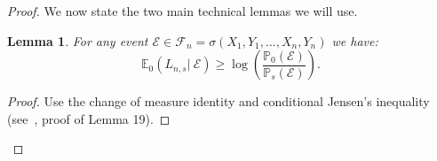 \documentclass[final,12pt]{colt2018}
\newtheorem{lem}{Lemma}
\begin{document}
\begin{proof}


We now state the two main technical lemmas we will use.

\begin{lem}\label{lem:1}
For any event $\mathcal E \in \mathcal F_n = \sigma(X_1, Y_1, ..., X_{n}, Y_{n})$ we have:
$$
\mathbb E_0(L_{n,s} | \ \mathcal E) \geq \log \left( \frac{\mathbb P_0(\mathcal E)}{\mathbb P_s(\mathcal E)} \right).
$$
\end{lem}
\begin{proof}
Use the change of measure identity and conditional Jensen's inequality (see~\cite{kaufmann2016complexity}, proof of Lemma 19).
\end{proof}


\end{proof}
\end{document}
